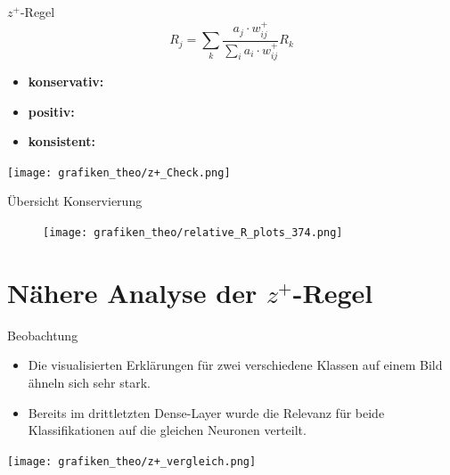 \begin{frame}{$z^+$-Regel}
\begin{equation*}
R_{j}=\sum_{k} \frac{a_{j} \cdot w_{i j}^+}{\sum_{i} a_{i} \cdot w_{i j}^+} R_{k}
\end{equation*}
\begin{itemize}
\item \textbf{konservativ:} \checkmark
\item \textbf{positiv:} \hspace{0.71cm} \checkmark
\item \textbf{konsistent:} \hspace{0.1cm} \checkmark
\end{itemize}
\texttt{[image: grafiken\_theo/z+\_Check.png]}
\end{frame}

\begin{frame}{Übersicht Konservierung}
\begin{figure}
\texttt{[image: grafiken\_theo/relative\_R\_plots\_374.png]}
\end{figure}
\end{frame}


\section{Nähere Analyse der $z^+$-Regel}
\frame{\sectionpage}
\begin{frame}{Beobachtung}
\begin{itemize}
\item Die visualisierten Erklärungen für zwei verschiedene Klassen auf einem Bild ähneln sich sehr stark.
\item Bereits im drittletzten Dense-Layer wurde die Relevanz für beide Klassifikationen auf die gleichen Neuronen verteilt.
\end{itemize}
\texttt{[image: grafiken\_theo/z+\_vergleich.png]}
\end{frame}

